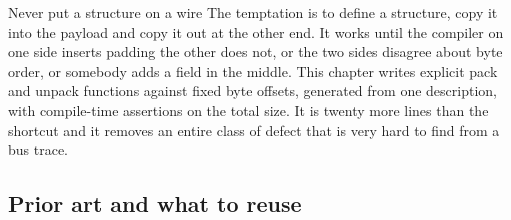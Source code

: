 \begin{note}{Never put a structure on a wire}
The temptation is to define a structure, copy it into the payload and copy it
out at the other end. It works until the compiler on one side inserts padding
the other does not, or the two sides disagree about byte order, or somebody adds
a field in the middle. This chapter writes explicit pack and unpack functions
against fixed byte offsets, generated from one description, with compile-time
assertions on the total size. It is twenty more lines than the shortcut and it
removes an entire class of defect that is very hard to find from a bus trace.
\end{note}

\subsection*{Prior art and what to reuse}

